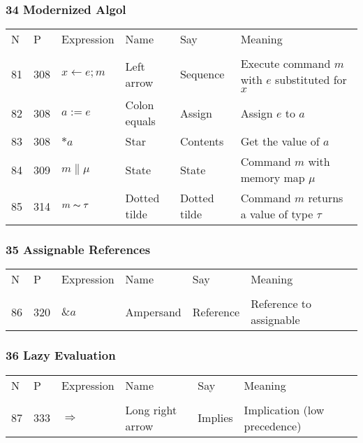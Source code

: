 \documentclass[12pt]{article}
\begin{document}
\subsubsection*{34 Modernized Algol}
\begin{tabular}[b] {p{} p{} p{} p{} 
p{} p{}}
N & P & Expression & Name & Say & Meaning \\ \\

81& 308 & $x \leftarrow e ; m$ & Left arrow & Sequence & Execute command $m$ with $e$ substituted for $x$ \\
82& 308 & $a := e$ & Colon equals & Assign & Assign $e$ to $a$\\
83 & 308 & $*a$ & Star & Contents & Get the value of $a$\\
84 & 309 & $ m \| \mu $& State & State & Command $m$ with memory map $\mu$\\
85 & 314 & $ m \thicksim \tau$ & Dotted tilde & Dotted tilde & Command $m$ returns a value of type $\tau$\\
\end{tabular}

\subsubsection*{35 Assignable References}
\begin{tabular}[b] {p{} p{} p{} p{} 
p{} p{}}
N & P & Expression & Name & Say & Meaning \\ \\

86 & 320 & $ \& a $ & Ampersand & Reference & Reference to assignable \\
 
\end{tabular}

\subsubsection*{36 Lazy Evaluation}
\begin{tabular}[b] {p{} p{} p{} p{} 
p{} p{}}
N & P & Expression & Name & Say & Meaning \\ \\

87 & 333 & $ \Longrightarrow $ & Long right arrow & Implies & Implication (low precedence) \\
 
\end{tabular}
\end{document}
